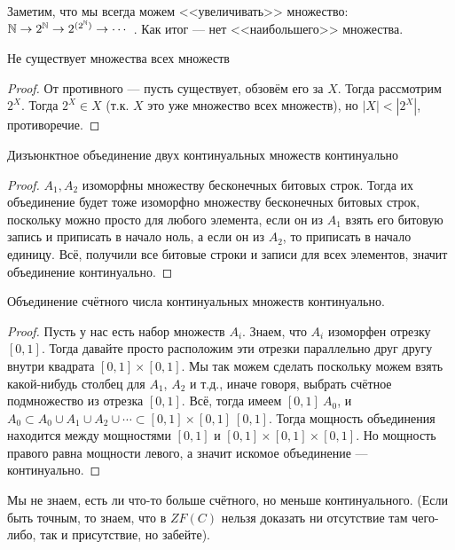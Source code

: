 Заметим, что мы всегда можем <<увеличивать>> множество: $\mathbb{N} \to 2^{\mathbb{N}} \to 2^{(2^{\mathbb{N}})} \to \cdots$ . Как итог --- нет <<наибольшего>> множества.

\begin{theorem}
	Не существует множества всех множеств
\end{theorem}
\begin{proof}
	От противного --- пусть существует, обзовём его за $X$. Тогда рассмотрим $2^X$. Тогда $2^X \in X$ (т.к. $X$ это уже множество всех множеств), но $|X| < |2^X|$, противоречие.
\end{proof}

\begin{theorem}
	Дизъюнктное объединение двух континуальных множеств континуально
\end{theorem}
\begin{proof}
	$A_1, A_2$ изоморфны множеству бесконечных битовых строк. Тогда их объединение будет тоже изоморфно множеству бесконечных битовых строк, поскольку можно просто для любого элемента, если он из $A_1$ взять его битовую запись и приписать в начало ноль, а если он из $A_2$, то приписать в начало единицу. Всё, получили все битовые строки и записи для всех элементов, значит объединение континуально.
\end{proof}

\begin{theorem}
	Объединение счётного числа континуальных множеств континуально.
\end{theorem}
\begin{proof}
	Пусть у нас есть набор множеств $A_i$. Знаем, что $A_i$ изоморфен отрезку $[0, 1]$. Тогда давайте просто расположим эти отрезки параллельно друг другу внутри квадрата $[0, 1] \times [0, 1]$. Мы так можем сделать поскольку можем взять какой-нибудь столбец для $A_1$, $A_2$ и т.д., иначе говоря, выбрать счётное подмножество из отрезка $[0, 1]$. Всё, тогда имеем $[0, 1] ~ A_0$, и $A_0 \subset A_0 \cup A_1 \cup A_2 \cup \cdots \subset [0, 1] \times [0, 1] ~ [0, 1]$. Тогда мощность объединения находится между мощностями $[0, 1]$ и $[0, 1] \times [0, 1] \times [0, 1]$. Но мощность правого равна мощности левого, а значит искомое объединение --- континуально.
\end{proof}

\begin{remark}
	Мы не знаем, есть ли что-то больше счётного, но меньше континуального. (Если быть точным, то знаем, что в $ZF(C)$ нельзя доказать ни отсутствие там чего-либо, так и присутствие, но забейте).
\end{remark}

